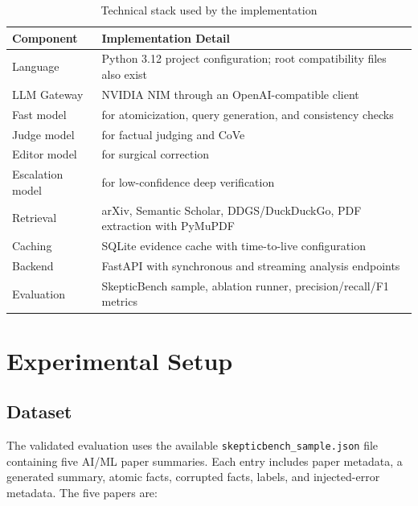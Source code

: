 \documentclass[12pt, a4paper]{report}
\begin{document}
\begin{table}[h!]
\centering
\caption{Technical stack used by the implementation}
\label{tab:techstack}
\begin{tabularx}{\textwidth}{L{4cm} X}
\toprule
\textbf{Component} & \textbf{Implementation Detail} \\
\midrule
{}
Language & Python 3.12 project configuration; root compatibility files also exist \\
LLM Gateway & NVIDIA NIM through an OpenAI-compatible client \\
Fast model &  for atomicization, query generation, and consistency checks \\
Judge model &  for factual judging and CoVe \\
Editor model &  for surgical correction \\
Escalation model &  for low-confidence deep verification \\
Retrieval & arXiv, Semantic Scholar, DDGS/DuckDuckGo, PDF extraction with PyMuPDF \\
Caching & SQLite evidence cache with time-to-live configuration \\
Backend & FastAPI with synchronous and streaming analysis endpoints \\
Evaluation & SkepticBench sample, ablation runner, precision/recall/F1 metrics \\
\bottomrule
\end{tabularx}
\end{table}


\chapter{Experimental Setup}

\section{Dataset}

The validated evaluation uses the available
\texttt{skepticbench\_sample.json} file containing five AI/ML paper summaries.
Each entry includes paper metadata, a generated summary, atomic facts, corrupted
facts, labels, and injected-error metadata. The five papers are:
\end{document}
